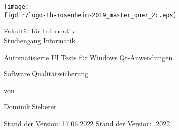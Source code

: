 \begin{titlepage}

\sffamily

\raggedleft

\vspace*{-2cm}

\texttt{[image: \\figdir/logo-th-rosenheim-2019\_master\_quer\_2c.eps]}

\vfill

\centering
\LARGE
Fakultät für Informatik  \vspace{0.5cm}\\
\Large
Studiengang Informatik

\vspace{2cm}

\LARGE

\centerline{Automatisierte UI Tests für Windows Qt-Anwendungen}	 


\vspace{2cm}

\Large
Software Qualitätssicherung

\vspace{1.5cm}


\Large
von

\vspace{0.5cm}


\LARGE
Dominik Sieberer \vspace{1cm}

\vspace{1cm}

\flushleft
 \Large
\vspace*{\fill}

\begin{tabbing}
Stand der Version: \= 17.06.2022 \kill
Stand der Version: .2022 \\
\end{tabbing}

\end{titlepage}

\cleardoubleemptypage









